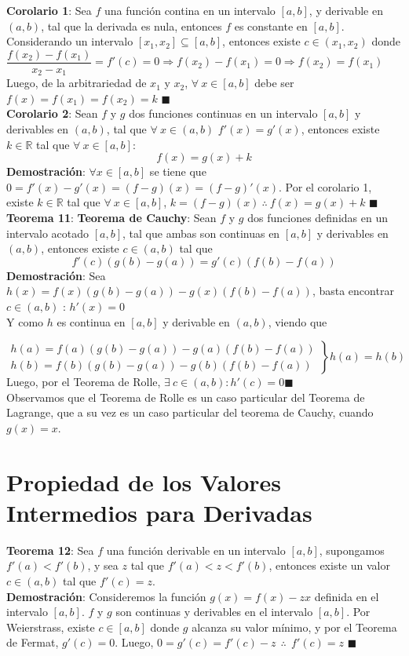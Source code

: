 \documentclass[11pt,a4paper]{article}
\newcommand*{\QEDA}{\null\nobreak\hfill\ensuremath{\blacksquare}}
\begin{document}
\noindent \textbf{Corolario 1}: Sea $f$ una funci\'on contina en un intervalo $[a,b]$, y derivable en $(a,b)$, tal que la derivada es nula, entonces $f$ es constante en $[a,b]$. Considerando un intervalo $[x_1,x_2] \subseteq [a,b]$, entonces existe $c\in(x_1,x_2)$ donde $\dfrac{f(x_2)-f(x_1)}{x_2-x_1} = f'(c) = 0 \Rightarrow f(x_2) - f(x_1) = 0 \Rightarrow f(x_2)=f(x_1)$\\
Luego, de la arbitrariedad de $x_1$ y $x_2$, $\forall\ x \in [a,b]$ debe ser $f(x)=f(x_1)=f(x_2)=k$ \QEDA\\

\noindent \textbf{Corolario 2}: Sean $f$ y $g$ dos funciones continuas en un intervalo $[a,b]$ y derivables en $(a,b)$, tal que $\forall\ x \in (a,b)$ $f'(x) = g'(x)$, entonces existe $k \in \mathbb{R}$ tal que $\forall\ x\in[a,b]$: $$f(x) = g(x)+k$$
\textbf{Demostraci\'on}: $\forall x\in[a,b]$ se tiene que $0 = f'(x)-g'(x) = (f-g)(x) = (f-g)'(x)$. Por el corolario 1, existe $k \in \mathbb{R}$ tal que $\forall\ x\in[a,b]$, $k=(f-g)(x)\ \therefore\ f(x)=g(x)+k$ \QEDA\\

\noindent \textbf{Teorema 11}: \textbf{Teorema de Cauchy}: Sean $f$ y $g$ dos funciones definidas en un intervalo acotado $[a,b]$, tal que ambas son continuas en $[a,b]$ y derivables en $(a,b)$, entonces existe $c\in(a,b)$ tal que $$f'(c)(g(b)-g(a)) = g'(c)(f(b)-f(a))$$
\textbf{Demostraci\'on}: Sea $h(x)=f(x)(g(b)-g(a))-g(x)(f(b)-f(a))$, basta encontrar $c\in(a,b)$ : $h'(x)=0$\\
Y como $h$ es continua en $[a,b]$ y derivable en $(a,b)$, viendo que 

$\left.\begin{array}{l}
h(a) = f(a)(g(b)-g(a))-g(a)(f(b)-f(a))\\
h(b) = f(b)(g(b)-g(a))-g(b)(f(b)-f(a))
\end{array}\right\} h(a)=h(b)$\\
Luego, por el Teorema de Rolle, $\exists\ c \in (a,b) : h'(c) = 0$\QEDA\\

Observamos que el Teorema de Rolle es un caso particular del Teorema de Lagrange, que a su vez es un caso particular del teorema de Cauchy, cuando $g(x)=x$.

\newpage
\section{Propiedad de los Valores Intermedios para Derivadas}
\textbf{Teorema 12}: Sea $f$ una funci\'on derivable en un intervalo $[a,b]$, supongamos $f'(a) < f'(b)$, y sea $z$ tal que $f'(a)<z<f'(b)$, entonces existe un valor $c \in (a,b)$ tal que $f'(c) = z$.\\
\textbf{Demostraci\'on}: Consideremos la funci\'on $g(x)=f(x)-zx$ definida en el intervalo $[a,b]$. $f$ y $g$ son continuas y derivables en el intervalo $[a,b]$. Por Weierstrass, existe $c \in [a,b]$ donde $g$ alcanza su valor m\'inimo, y por el Teorema de Fermat, $g'(c) = 0$. Luego, $0 = g'(c) = f'(c) - z \ \ \therefore \ \ f'(c) = z$ \QEDA\\
\end{document}
